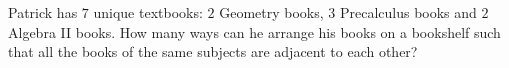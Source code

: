Patrick has $7$ unique textbooks: $2$ Geometry books, $3$ Precalculus books and $2$ Algebra II books. How many ways can he arrange his books on a bookshelf such that all the books of the same subjects are adjacent to each other?
